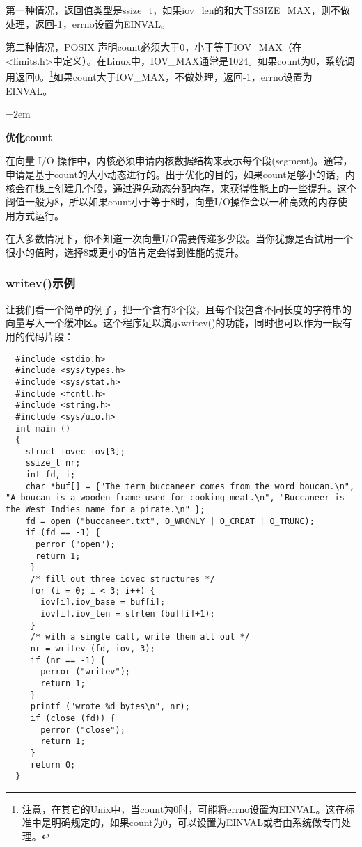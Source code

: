 第一种情况，返回值类型是ssize\_t，如果iov\_len的和大于SSIZE\_MAX，则不做处理，返回-1，errno设置为EINVAL。

第二种情况，POSIX 声明count必须大于0，小于等于IOV\_MAX（在\\<limits.h>中定义）。在Linux中，IOV\_MAX通常是1024。如果count为0，系统调用返回0。\footnote[2]{注意，在其它的Unix中，当count为0时，可能将errno设置为EINVAL。这在标准中是明确规定的，如果count为0，可以设置为EINVAL或者由系统做专门处理。}如果count大于IOV\_MAX，不做处理，返回-1，errno设置为\\EINVAL。

\begin{center}
\begin{boxedminipage}{\textwidth}
\parindent=2em
\begin{center}\textbf{优化count}\end{center}

在向量 I/O 操作中，内核必须申请内核数据结构来表示每个段(segment)。通常，申请是基于count的大小动态进行的。出于优化的目的，如果count足够小的话，内核会在栈上创建几个段，通过避免动态分配内存，来获得性能上的一些提升。这个阈值一般为8，所以如果count小于等于8时，向量I/O操作会以一种高效的内存使用方式运行。

在大多数情况下，你不知道一次向量I/O需要传递多少段。当你犹豫是否试用一个很小的值时，选择8或更小的值肯定会得到性能的提升。
\end{boxedminipage}
\end{center}

\subsubsection{writev()示例}

让我们看一个简单的例子，把一个含有3个段，且每个段包含不同长度的字符串的向量写入一个缓冲区。这个程序足以演示writev()的功能，同时也可以作为一段有用的代码片段：

\begin{lstlisting}
  #include <stdio.h>
  #include <sys/types.h>
  #include <sys/stat.h>
  #include <fcntl.h>
  #include <string.h>
  #include <sys/uio.h>
  int main ()
  {
    struct iovec iov[3];
    ssize_t nr;
    int fd, i;
    char *buf[] = {"The term buccaneer comes from the word boucan.\n", "A boucan is a wooden frame used for cooking meat.\n", "Buccaneer is the West Indies name for a pirate.\n" };
    fd = open ("buccaneer.txt", O_WRONLY | O_CREAT | O_TRUNC);
    if (fd == -1) {
      perror ("open");
      return 1;
     }
     /* fill out three iovec structures */
     for (i = 0; i < 3; i++) {
       iov[i].iov_base = buf[i];
       iov[i].iov_len = strlen (buf[i]+1);
     }
     /* with a single call, write them all out */
     nr = writev (fd, iov, 3);
     if (nr == -1) {
       perror ("writev");
       return 1;
     }
     printf ("wrote %d bytes\n", nr);
     if (close (fd)) {
       perror ("close");
       return 1;
     }
     return 0;
  }
\end{lstlisting}

